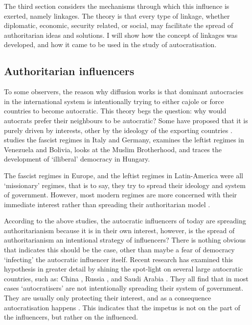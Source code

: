 The third section considers the mechanisms through which this influence is exerted, namely linkages. The theory is that every type of linkage, whether diplomatic, economic, security related, or social, may facilitate the spread of authoritarian ideas and solutions. I will show how the concept of linkages was developed, and how it came to be used in the study of autocratisation. 

\subsection{Authoritarian influencers}
To some observers, the reason why diffusion works is that dominant autocracies in the international system is intentionally trying to either cajole or force countries to become autocratic. This theory begs the question: why would autocrats prefer their neighbours to be autocratic? Some have proposed that it is purely driven by interests, other by the ideology of the exporting countries \citep{weyland_autocratic_2017}.  \citet{weyland_fascisms_2017} studies the fascist regimes in Italy and Germany, \citet{de_la_torre_hugo_2017} examines the leftist regimes in Venezuela and Bolivia, \citet{darwich_creating_2017} looks at the Muslim Brotherhood, and \citet{buzogany_illiberal_2017} traces the development of `illiberal' democracy in Hungary. 

The fascist regimes in Europe, and the leftist regimes in Latin-America were all `missionary' regimes, that is to say, they try to spread their ideology and system of government. However, most modern regimes are more concerned with their immediate interest rather than spreading their authoritarian model \citep{bank_study_2017, brownlee_limited_2017}. 

According to the above studies, the autocratic influencers of today are spreading authoritarianism because it is in their own interest, however, is the spread of authoritarianism an intentional strategy of influencers? There is nothing obvious that indicates this should be the case, other than maybe a fear of democracy `infecting' the autocratic influencer itself. Recent research has examined this hypothesis in greater detail by shining the spot-light on several large autocratic countries, such as: China \citep{chen_democracy_2015, hackenesch_not_2015}, Russia \citep{babayan_return_2015, delcour_spoiler_2015}, and Saudi Arabia \citep{freyburg_local_2015, hassan_undermining_2015}.  They all find that in most cases `autocratisers' are not intentionally spreading their system of government. They are usually only protecting their interest, and as a consequence autocratisation happens \citep{risse_democracy_2015, borzel_noble_2015}. This indicates that the impetus is not on the part of the influencers, but rather on the influenced. 

